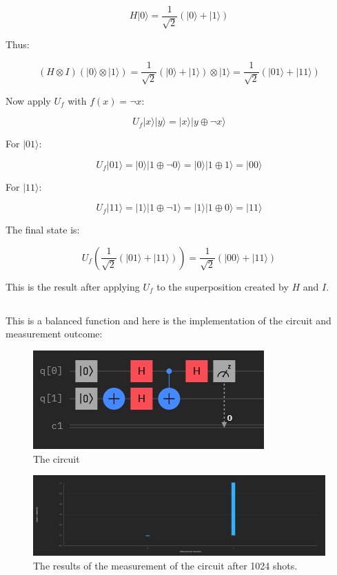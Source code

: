 \documentclass[12pt]{article}
\begin{document}
\[
H|0\rangle = \frac{1}{\sqrt{2}}(|0\rangle + |1\rangle)
\]

Thus:

\[
(H \otimes I) (|0\rangle \otimes |1\rangle) = \frac{1}{\sqrt{2}}(|0\rangle + |1\rangle) \otimes |1\rangle = \frac{1}{\sqrt{2}}(|01\rangle + |11\rangle)
\]

Now apply \( U_f \) with \( f(x) = \neg x \):

\[
U_f |x\rangle |y\rangle = |x\rangle |y \oplus \neg x\rangle
\]

\newpage

For \( |01\rangle \):

\[
U_f |01\rangle = |0\rangle |1 \oplus \neg 0\rangle = |0\rangle |1 \oplus 1\rangle = |00\rangle
\]

For \( |11\rangle \):

\[
U_f |11\rangle = |1\rangle |1 \oplus \neg 1\rangle = |1\rangle |1 \oplus 0\rangle = |11\rangle
\]

The final state is:

\[
U_f \left(\frac{1}{\sqrt{2}}(|01\rangle + |11\rangle)\right) = \frac{1}{\sqrt{2}}(|00\rangle + |11\rangle)
\]

This is the result after applying \( U_f \) to the superposition created by \( H \) and \( I \).


\subsection*{}

This is a balanced function and here is the implementation of the circuit and measurement outcome:

\begin{figure}[H]
    \centering
    \includegraphics[scale=0.9]{1c.png}
    \caption{The circuit}
\end{figure}

\begin{figure}[H]
    \centering
    \includegraphics[scale=0.27]{1cr.png}
    \caption{The results of the measurement of the circuit after 1024 shots.}
\end{figure}
\end{document}
